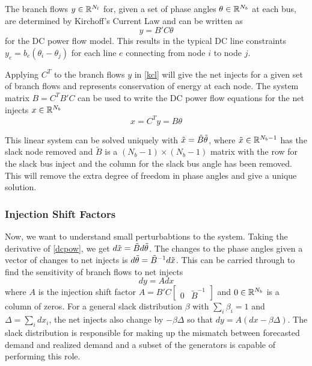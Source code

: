 The branch flows $y \in \mathbb{R}^{N_l}$ for, given a set of phase angles $\theta \in \mathbb{R}^{N_b}$ at each bus, are determined by Kirchoff's Current Law and can be written as
\begin{equation}\label{kcl}
y=B' C \theta
\end{equation}
for the DC power flow model.  This results in the typical DC line constraints $y_{e} = b_{e} (\theta_i - \theta_j)$ for each line $e$ connecting from node $i$ to node $j$.  

Applying $C^T$ to the branch flows $y$ in \ref{kcl} will give the net injects for a given set of branch flows and represents conservation of energy at each node.
  The system matrix $B = C^T B' C$ can be used to write the DC power flow equations for the net injects $x \in \mathbb{R}^{N_b}$
\begin{equation}\label{dcpow}
x = C^T y = B \theta
\end{equation}

This linear system can be solved uniquely with $\tilde{x} = \tilde{B} \tilde{\theta}$, where $\tilde{x} \in \mathbb{R}^{N_b-1}$ has the slack node removed and $\tilde{B}$ is a $(N_b-1) \times (N_b-1)$ matrix with the row for the slack bus inject and the column for the slack bus angle has been removed.  This will remove the extra degree of freedom in phase angles and give a unique solution.

\subsubsection*{Injection Shift Factors}
Now, we want to understand small perturbabtions to the system.  Taking the derivative of \ref{dcpow}, we get $d \tilde{x} = \tilde{B} d \tilde{\theta} $.  The changes to the phase angles given a vector of changes to net injects is $ d \tilde{\theta} = \tilde{B}^{-1} d \tilde{x} $.  This can be carried through to find the sensitivity of branch flows to net injects 
\begin{equation}\label{isf}
 d y = A d x 
\end{equation}
where $A$ is the injection shift factor $A = B' C \left[\begin{array}{cc} 0 & \tilde{B}^{-1} \end{array} \right]$ and $0\in \mathbb{R}^{N_b}$ is a column of zeros.  For a general slack distribution $\beta$ with $\sum_i \beta_i=1$ and $\Delta = \sum_i dx_i$, the net injects also change by $- \beta \Delta$ so that $dy = A\left( dx - \beta \Delta \right)$.  The slack distribution is responsible for making up the mismatch between forecasted demand and realized demand and a subset of the generators is capable of performing this role.



